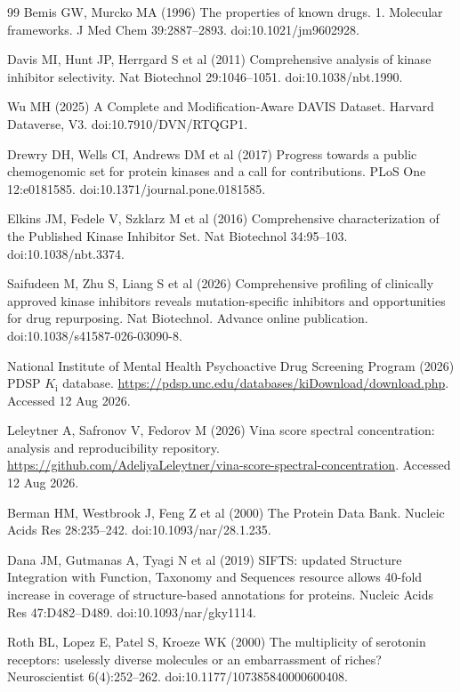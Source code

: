 \begin{thebibliography}{99}
 Bemis GW, Murcko MA (1996) The properties of known drugs.
1. Molecular frameworks. J Med Chem 39:2887--2893.
doi:10.1021/jm9602928.

 Davis MI, Hunt JP, Herrgard S et al (2011) Comprehensive
analysis of kinase inhibitor selectivity. Nat Biotechnol 29:1046--1051.
doi:10.1038/nbt.1990.

 Wu MH (2025) A Complete and Modification-Aware DAVIS
Dataset. Harvard Dataverse, V3. doi:10.7910/DVN/RTQGP1.

 Drewry DH, Wells CI, Andrews DM et al (2017) Progress
towards a public chemogenomic set for protein kinases and a call for
contributions. PLoS One 12:e0181585. doi:10.1371/journal.pone.0181585.

 Elkins JM, Fedele V, Szklarz M et al (2016) Comprehensive
characterization of the Published Kinase Inhibitor Set. Nat Biotechnol 34:95--103.
doi:10.1038/nbt.3374.

 Saifudeen M, Zhu S, Liang S et al (2026) Comprehensive profiling of
clinically approved kinase inhibitors reveals mutation-specific inhibitors and opportunities
for drug repurposing. Nat Biotechnol. Advance online publication.
doi:10.1038/s41587-026-03090-8.

 National Institute of Mental Health Psychoactive Drug Screening
Program (2026) PDSP $K_\mathrm{i}$ database.
\url{https://pdsp.unc.edu/databases/kiDownload/download.php}. Accessed 12 Aug 2026.

 Leleytner A, Safronov V, Fedorov M (2026)
Vina score spectral concentration: analysis and reproducibility repository.
\url{https://github.com/AdeliyaLeleytner/vina-score-spectral-concentration}.
Accessed 12 Aug 2026.

 Berman HM, Westbrook J, Feng Z et al (2000) The Protein
Data Bank. Nucleic Acids Res 28:235--242. doi:10.1093/nar/28.1.235.

 Dana JM, Gutmanas A, Tyagi N et al (2019) SIFTS:
updated Structure Integration with Function, Taxonomy and Sequences resource
allows 40-fold increase in coverage of structure-based annotations for proteins.
Nucleic Acids Res 47:D482--D489. doi:10.1093/nar/gky1114.

 Roth BL, Lopez E, Patel S, Kroeze WK (2000) The multiplicity of serotonin
receptors: uselessly diverse molecules or an embarrassment of riches? Neuroscientist
6(4):252--262. doi:10.1177/107385840000600408.


\end{thebibliography}
